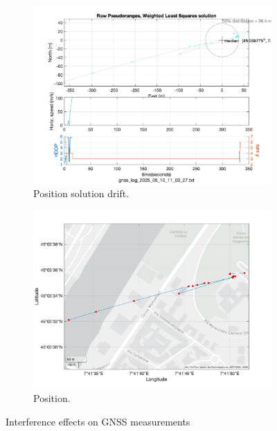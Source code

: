 \begin{figure}[h!]
\begin{subfigure}{0.23\textwidth}
                \label{fig:interference_cno}
            \end{subfigure}
            \hfill
            \begin{subfigure}{0.22\textwidth}            
                \vspace{0.40cm}
                \includegraphics[width=\textwidth]{images/tests/Monte_Cappuccini/Interferences/Samsung_A51_Monte_Cappuccini_interference_fig4.png}
                \caption{Position solution drift.}
                \label{fig:interference_pos}
            \end{subfigure}
            \hfill
            \begin{subfigure}{0.23\textwidth}
                \vspace{0.40cm}
                \includegraphics[width=\textwidth]{images/tests/Monte_Cappuccini/Interferences/Samsung_A51_Monte_Cappuccini_interference_fig6.png}
                \caption{Position.}
                \label{fig:interference_pos}
            \end{subfigure}
            \vspace{0.35cm}
            \caption{Interference effects on GNSS measurements}
            \label{fig:interference_plots}
        \end{figure}
        
